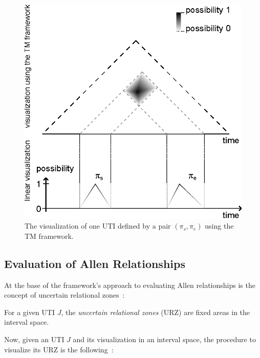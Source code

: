 \begin{figure}[h]
	\centering
	\includegraphics[width=0.9\columnwidth]{graphs/TM_model_ill_known.eps}
	\caption{The visualization of one UTI defined by a pair $(\pi_s, \pi_e)$ using the TM framework.}
	\label{fig:tm-ill-const-ex}
\end{figure}
\vspace{-10pt}

\subsection{\label{subsec:tm-evaluation}Evaluation of Allen Relationships}
At the base of the framework's approach to evaluating Allen relationships is the concept of uncertain relational zones~\cite{DeTre2012}:

\begin{definition}
For a given UTI $J$, the \emph{uncertain relational zones} (URZ) are fixed areas in the interval space.
\end{definition}

Now, given an UTI $J$ and its visualization in an interval space, the procedure to visualize its URZ is the following~\cite{DeTre2012}:


